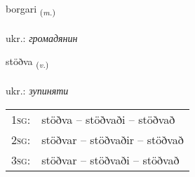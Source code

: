 \documentclass[frontgrid, backgrid]{flacards}\usepackage[]{graphicx}\usepackage[]{xcolor}
\begin{document}
\renewcommand{\blhead}{\vskip5pt {\small\bfseries\footnotesize Nafnorð | іменник }}
\renewcommand{\bcfoot}{\vskip5pt \hspace{2pt}{\small\bfseries\footnotesize 2K}}


{borgari \small{\textsubscript{(\textit{m.})}} \\[1ex] %
\textphonetic{[pɔrkarɪ]} \\
ukr.: \emph{громадянин} \\  [2ex]
\renewcommand*{\arraystretch}{0.8}
}

\renewcommand{\flhead}{\vskip5pt \fboxsep=0pt {\small\bfseries\footnotesize Sagnorð | дієслово}}
\renewcommand{\fcfoot}{\vskip5pt \fboxsep=0pt \hspace{2pt}{\small\bfseries\footnotesize 2K}}

\renewcommand{\blhead}{\vskip5pt {\small\bfseries\footnotesize Sagnorð | дієслово }}
\renewcommand{\bcfoot}{\vskip5pt \hspace{2pt}{\small\bfseries\footnotesize 2K}}


{stöðva \small{\textsubscript{(\textit{v.})}} \\[1ex] %
\textphonetic{[stœðva]} \\
ukr.: \emph{зупиняти} \\  [2ex]
\renewcommand*{\arraystretch}{0.8}
\begin{tabular}{p{1cm}l}
\textsc{1sg}: & stöðva -- stöðvaði -- stöðvað \\ 
\textsc{2sg}: & stöðvar -- stöðvaðir -- stöðvað \\ 
\textsc{3sg}: & stöðvar -- stöðvaði -- stöðvað \\ 
\end{tabular}
}
\end{document}
